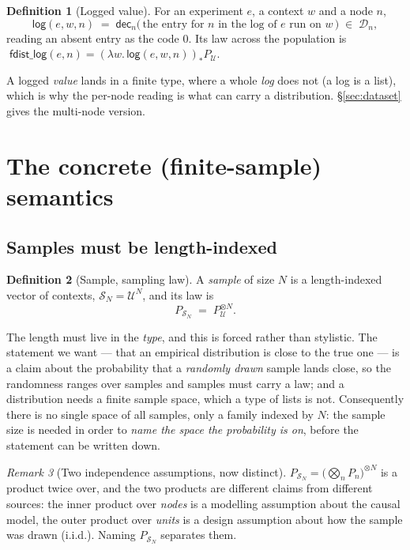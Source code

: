 \documentclass[11pt,a4paper]{article}
\theoremstyle{definition}
\newtheorem{definition}{Definition}[section]
\theoremstyle{plain}
\theoremstyle{remark}
\newtheorem{remark}[definition]{Remark}
\newcommand{\dom}{\mathcal{D}}
\newcommand{\Ctx}{\mathcal{U}}         %
\newcommand{\dect}{\mathsf{dec}}
\newcommand{\push}[1]{{#1}_{*}}        %
\newcommand{\Smp}{\mathcal{S}}         %
\newcommand{\logv}{\mathsf{log}}
\begin{document}
\begin{definition}[Logged value]
For an experiment $e$, a context $w$ and a node $n$,
\[
  \logv(e,w,n) \;=\; \dect_n\bigl(\,\text{the entry for } n \text{ in the log of } e \text{ run on } w\,\bigr)
  \;\in\; \dom_n ,
\]
reading an absent entry as the code $0$. Its law across the population is
$\;\mathsf{fdist\_log}(e,n) = \push{(\lambda w.\,\logv(e,w,n))} P_\Ctx$.
\end{definition}

A logged \emph{value} lands in a finite type, where a whole \emph{log} does
not (a log is a list), which is why the per-node reading is what can carry
a distribution. \S\ref{sec:dataset} gives the multi-node version.

\section{The concrete (finite-sample) semantics}

\subsection{Samples must be length-indexed}

\begin{definition}[Sample, sampling law]
A \emph{sample} of size $N$ is a length-indexed vector of contexts,
$\Smp_N = \Ctx^N$, and its law is
\[
  P_{\Smp_N} \;=\; P_\Ctx^{\otimes N}.
\]
\end{definition}

The length must live in the \emph{type}, and this is forced rather than
stylistic. The statement we want --- that an empirical distribution is
close to the true one --- is a claim about the probability that a
\emph{randomly drawn} sample lands close, so the randomness ranges over
samples and samples must carry a law; and a distribution needs a finite
sample space, which a type of lists is not. Consequently there is no single
space of all samples, only a family indexed by $N$: the sample size is
needed in order to \emph{name the space the probability is on}, before the
statement can be written down.

\begin{remark}[Two independence assumptions, now distinct]
$P_{\Smp_N} = \bigl(\bigotimes_n P_n\bigr)^{\otimes N}$ is a product
twice over, and the two products are different claims from different
sources: the inner product over \emph{nodes} is a modelling assumption
about the causal model, the outer product over \emph{units} is a design
assumption about how the sample was drawn (i.i.d.). Naming
$P_{\Smp_N}$ separates them.
\end{remark}
\end{document}
